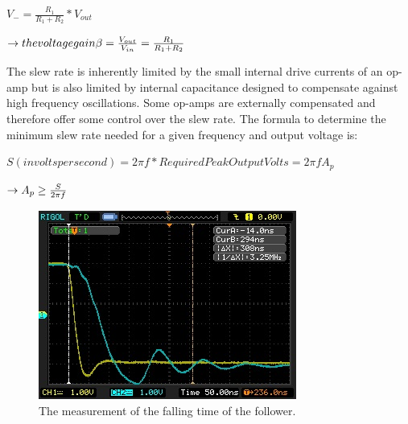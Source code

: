\documentclass[11pt]{article}
\begin{document}
$V_{-}=\frac{R_{1}}{R_{1}+R_{2}}*V_{out}$

$\rightarrow the voltage gain \beta = {V_{out}\over V_{in}}={R_{1}\over R_{1}+R_{2}}$

The slew rate is inherently limited by the small internal drive currents of an op-amp but is also limited by internal capacitance designed to compensate against high frequency oscillations. Some op-amps are externally compensated and therefore offer some control over the slew rate. The formula to determine the minimum slew rate needed for a given frequency and output voltage is:

$S(in volts per second)=2\pi f*Required Peak Output Volts=2\pi fA_{p}$

$\rightarrow A_{p}\geq {S\over 2\pi f}$


\begin{figure}[H]
 \begin{center}
  \includegraphics[width=\linewidth/1]{act1falling}
  \caption{The measurement of the falling time of the follower.}
  \label{fig:act1falling}
 \end{center}
\end{figure}
\end{document}

